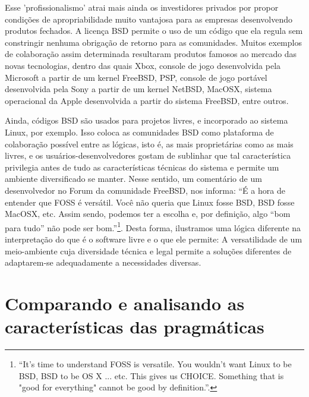 Esse 'profissionalismo' atrai mais ainda os investidores privados por propor condições de apropriabilidade muito vantajosa para as empresas desenvolvendo produtos fechados. A licença BSD permite o uso de um código que ela regula sem constringir nenhuma obrigação de retorno para as comunidades. Muitos exemplos de colaboração assim determinada resultaram produtos famosos ao mercado das novas tecnologias, dentro das quais Xbox, console de jogo desenvolvida pela Microsoft a partir de um kernel FreeBSD, PSP, console de jogo portável desenvolvida pela Sony a partir de um kernel NetBSD, MacOSX, sistema operacional da Apple desenvolvida a partir do sistema FreeBSD, entre outros.

Ainda, códigos BSD são usados para projetos livres, e incorporado ao sistema Linux, por exemplo. Isso coloca as comunidades BSD como plataforma de colaboração possível entre as lógicas, isto é, as mais proprietárias como as mais livres, e os usuários-desenvolvedores gostam de sublinhar que tal característica privilegia antes de tudo as características técnicas do sistema e permite um ambiente diversificado se manter. Nesse sentido, um comentário de um desenvolvedor no Forum da comunidade FreeBSD, nos informa: “É a hora de entender que FOSS é versátil. Você não queria que Linux fosse BSD, BSD fosse MacOSX, etc. Assim sendo, podemos ter a escolha e, por definição, algo “bom para tudo” não pode ser bom.”\footnote{“It's time to understand FOSS is versatile. You wouldn't want Linux to be BSD, BSD to be OS X ... etc. This gives us CHOICE. Something that is "good for everything" cannot be good by definition.”.}. Desta forma, ilustramos uma lógica diferente na interpretação do que é o software livre e o que ele permite: A versatilidade de um meio-ambiente cuja diversidade técnica e legal permite a soluções diferentes de adaptarem-se adequadamente a necessidades diversas.

\section{Comparando e analisando as características das pragmáticas} \label{3.5}

